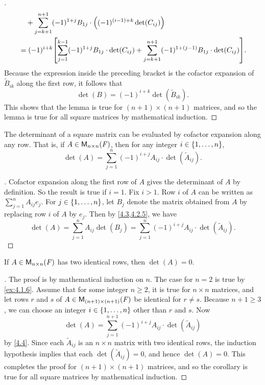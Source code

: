 \begin{proof}[]
\begin{align*}
		        & \quad + \sum_{j = k + 1}^{n + 1} (-1)^{1 + j} B_{1 j} \cdot \pa{(-1)^{(i - 1) + k} \det(C_{i j})}                                                            \\
		        & = (-1)^{i + k} \br{\sum_{j = 1}^{k - 1} (-1)^{1 + j} B_{1 j} \cdot \det(C_{i j}) + \sum_{j = k + 1}^{n + 1} (-1)^{1 + (j - 1)} B_{1 j} \cdot \det(C_{i j})}.
	\end{align*}
	Because the expression inside the preceding bracket is the cofactor expansion of \(\tilde{B}_{i k}\) along the first row, it follows that
	\[
		\det(B) = (-1)^{i + k} \det(\tilde{B}_{i k}).
	\]
	This shows that the lemma is true for \((n + 1) \times (n + 1)\) matrices, and so the lemma is true for all square matrices by mathematical induction.
\end{proof}

\begin{thm}\label{4.4}
	The determinant of a square matrix can be evaluated by cofactor expansion along any row.
	That is, if \(A \in \ms[n][n][\F]\), then for any integer \(i \in \left\lbrace1, \dots, n\right\rbrace\),
	\[
		\det(A) = \sum_{j = 1}^n (-1)^{i + j} A_{i j} \cdot \det(\tilde{A}_{i j}).
	\]
\end{thm}

\begin{proof}[]
	Cofactor expansion along the first row of \(A\) gives the determinant of \(A\) by definition.
	So the result is true if \(i = 1\).
	Fix \(i > 1\).
	Row \(i\) of \(A\) can be written as \(\sum_{j = 1}^n A_{i j} e_j\).
	For \(j \in \left\lbrace1, \dots, n\right\rbrace\), let \(B_j\) denote the matrix obtained from \(A\) by replacing row \(i\) of \(A\) by \(e_j\).
	Then by \cref{4.3,4.2.5}, we have
	\[
		\det(A) = \sum_{j = 1}^n A_{i j} \det(B_j) = \sum_{j = 1}^n (-1)^{i + j} A_{i j} \cdot \det(\tilde{A}_{i j}).
	\]
\end{proof}

\begin{cor}\label{4.2.6}
	If \(A \in \ms[n][n][\F]\) has two identical rows, then \(\det(A) = 0\).
\end{cor}

\begin{proof}[]
	The proof is by mathematical induction on \(n\).
	The case for \(n = 2\) is true by \cref{ex:4.1.6}.
	Assume that for some integer \(n \geq 2\), it is true for \(n \times n\) matrices, and let rows \(r\) and \(s\) of \(A \in \ms[(n + 1)][(n + 1)][\F]\) be identical for \(r \neq s\).
	Because \(n + 1 \geq 3\), we can choose an integer \(i \in \left\lbrace1, \dots, n\right\rbrace\) other than \(r\) and \(s\).
	Now
	\[
		\det(A) = \sum_{j = 1}^{n + 1} (-1)^{i + j} A_{i j} \cdot \det(\tilde{A}_{i j})
	\]
	by \cref{4.4}.
	Since each \(\tilde{A}_{i j}\) is an \(n \times n\) matrix with two identical rows, the induction hypothesis implies that each \(\det(\tilde{A}_{i j}) = 0\), and hence \(\det(A) = 0\).
	This completes the proof for \((n + 1) \times (n + 1)\) matrices, and so the corollary is true for all square matrices by mathematical induction.
\end{proof}

